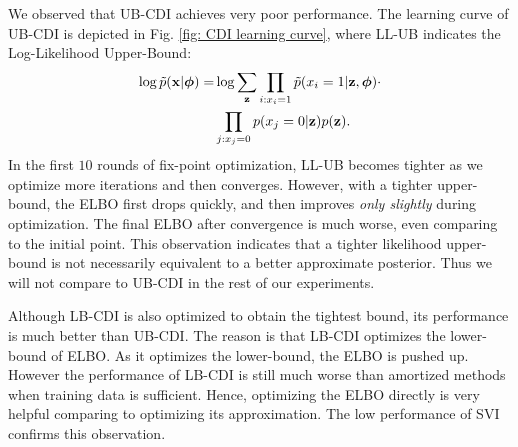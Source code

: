 We observed that UB-CDI achieves very poor performance. 
The learning curve of UB-CDI is depicted in Fig. \ref{fig: CDI learning curve}, where LL-UB indicates the Log-Likelihood Upper-Bound:
\begin{align*}
\log \Tilde{p}(\mathbf{x}|\bm{\phi})  =& \log \sum_{\mathbf{z}} \prod_{i:x_i=1} \Tilde{p}(x_i=1|\mathbf{z}, \bm{\phi}) \cdot\\
&\prod_{j:x_j=0}p(x_j=0|\mathbf{z})p(\mathbf{z}).
\end{align*}
In the first $10$ rounds of fix-point optimization, LL-UB becomes tighter as we optimize more iterations and then converges. However, with a tighter upper-bound, the ELBO first drops quickly, and then improves \emph{only slightly} during optimization. The final ELBO after convergence is much worse, even comparing to  the initial point. This observation indicates that a tighter likelihood upper-bound is not necessarily equivalent to a better approximate posterior. Thus we will not compare to UB-CDI in the rest of our experiments.

Although LB-CDI is also optimized to obtain the tightest bound, its performance is much better than UB-CDI. The reason is that LB-CDI optimizes the lower-bound of ELBO. As it optimizes the lower-bound, the ELBO is pushed up. However the performance of LB-CDI is still much worse than amortized methods when training data is sufficient. Hence, optimizing the ELBO directly is very helpful comparing to optimizing its approximation. The low performance of SVI confirms this observation. 

